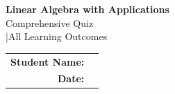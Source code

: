 \documentclass[12pt,a4paper]{article}
\begin{document}
	
	\begin{titlepage}
		\centering
		\vspace{2cm}
		{\Huge\bfseries\color{headergray} Linear Algebra with Applications\\[0.5em]}
		{\Large\color{subtopicgold} Comprehensive Quiz\\[2em]}
		{\large\color{gray} \quad|\quad All Learning Outcomes\\[0.5em]}
		
		\vspace{2.5cm}
		
		{\large
			\begin{tabular}{rl}
				\textbf{Student Name:}   & \underline{\hspace{8cm}} \\[1.2em]
				\textbf{Date:}           & \underline{\hspace{8cm}} \\[1.2em]
			\end{tabular}
		}
		
		\vspace{2cm}
		

\end{titlepage}
\end{document}
